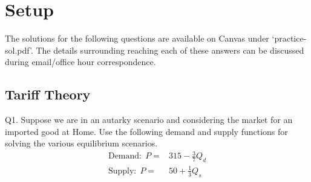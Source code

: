 \documentclass[12pt]{article}
\begin{document}
\singlespacing


\bigskip

\doublespacing



\section*{Setup}

\noindent 
The solutions for the following questions are available on Canvas under `practice-sol.pdf'.
The details surrounding reaching each of these answers can be discussed during email/office hour correspondence.

\subsection*{Tariff Theory}

\noindent Q1. Suppose we are in an autarky scenario and considering the market for an imported good at Home. 
Use the following demand and supply functions for solving the various equilibrium scenarios.
\begin{align*}
\text{Demand:} \ \  P = & 315 - \frac{3}{7} Q_d\\
\text{Supply:}\ \  P = & 50  + \frac{1}{3} Q_s
\end{align*}
\end{document}
